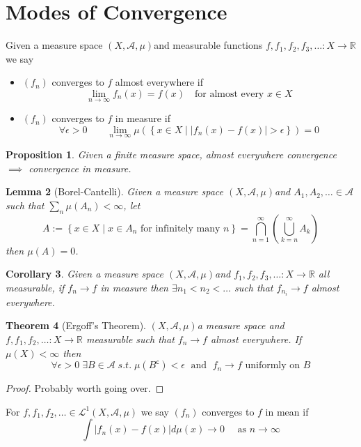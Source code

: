 \documentclass[11pt]{article}
\newcommand{\defeq}{:=}
\newcommand{\abs}[1]{|#1|}
\newcommand{\msrspc}{\ensuremath{(X,\mathcal{A},\mu)}}
\newcommand{\relmiddle}[1]{\mathrel{}\middle#1\mathrel{}}
\newcommand{\rmv}{\relmiddle|}
\newcommand{\stcmp}{^{\mathsf{c}}}
\newcommand{\R}{\mathbb{R}}
\newenvironment{defin}
	{\begin{mdframed}[backgroundcolor=white, roundcorner=5pt, linewidth=1pt]}
	{\end{mdframed}}
\newcommand{\mdf}[1]{{\color{red} #1}}
\newtheorem{theorem}{Theorem}[section]
\newtheorem{prop}[theorem]{Proposition}
\newtheorem{cor}[theorem]{Corollary}
\newtheorem{lemma}[theorem]{Lemma}
\begin{document}
\section{Modes of Convergence}
\begin{defin}
Given a measure space \msrspc	 and measurable functions $f,f_1, f_2, f_3, \dots:X\to \R$ we say
\begin{itemize}
	\item $(f_n)$ \mdf{converges to $f$ almost everywhere} if
		\[
			\lim_{n\to\infty}f_n (x) = f(x) \quad \text{for almost every }x\in X
		\]
	\item $(f_n)$ \mdf{converges to $f$ in measure} if
		\[
			\forall\epsilon >0 \quad \quad\lim_{n\to\infty}\mu\left(\left\{x\in X \rmv \abs{f_n(x)-f(x)}>\epsilon\right\}\right)=0
		\]
		
\end{itemize}
\end{defin}
\begin{prop}
Given a finite measure space, almost everywhere convergence $\implies$ convergence in measure.
\end{prop}
\begin{lemma}[Borel-Cantelli]
Given a measure space \msrspc and $A_1, A_2, \dots \in \mathcal{A}$ such that $\sum_{n}\mu(A_n)<\infty$, let
\[
	A\defeq\left\{x \in X \rmv x\in A_n \text{ for infinitely many }n\right\}=\bigcap_{n=1}^\infty\left(\bigcup_{k=n}^\infty A_k\right)
\]
then $\mu(A) = 0$.
\end{lemma}
\begin{cor}
Given a measure space \msrspc and $f_1, f_2, f_3, \dots:X \to \R$ all measurable, if $f_n\to f$ in measure then $\exists n_1 < n_2 < \dots$ such that $f_{n_i}\to f$ almost everywhere.
\end{cor}
\begin{theorem}[Ergoff's Theorem]
\msrspc a measure space and $f, f_1, f_2, \dots: X \to \R$ measurable such that $f_n\to f$ almost everywhere.
If $\mu(X)< \infty$ then
\[
	\forall\epsilon > 0 \; \exists B\in\mathcal{A}\;s.t.\;\mu(B\stcmp)<\epsilon\;\text{ and }\;f_n\to f\text{ uniformly on }B
\]
\end{theorem}
\begin{proof}
Probably worth going over.
\end{proof}
\begin{defin}
	For $f, f_1, f_2, \dots\in \mathcal{L}^1(X, \mathcal{A}, \mu)$ we say \mdf{$(f_n)$ converges to $f$ in mean} if
		\[
			\int \abs{f_n(x)- f(x)} d\mu(x) \to 0 \quad \text{ as }n \to\infty
		\]
\end{defin}
\end{document}
